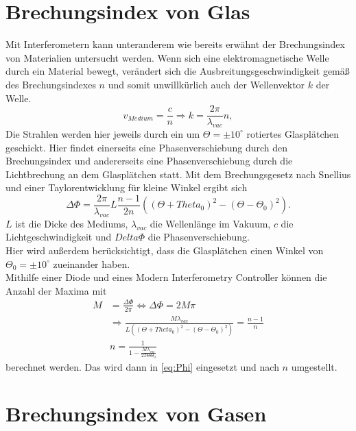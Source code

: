 \section{Brechungsindex von Glas}
\label{sec:BrechungGlas}
Mit Interferometern kann unteranderem wie bereits erwähnt der Brechungsindex von Materialien untersucht werden. Wenn sich eine elektromagnetische
Welle durch ein Material bewegt, verändert sich die Ausbreitungsgeschwindigkeit gemäß des Brechungsindexes $n$ und somit unwillkürlich auch der Wellenvektor $k$
der Welle.
\begin{equation}
    v_{Medium} = \frac{c}{n} \Rightarrow k = \frac{2\pi}{\lambda_{vac}}n,
\end{equation}
Die Strahlen werden hier jeweils durch ein um $\Theta = \pm 10^\circ$ rotiertes Glasplätchen geschickt. Hier findet einerseits eine Phasenverschiebung durch den Brechungsindex
und andererseits eine Phasenverschiebung durch die Lichtbrechung an dem Glasplätchen statt. Mit dem Brechungsgesetz nach Snellius und einer Taylorentwicklung für kleine
Winkel ergibt sich 
\begin{equation}
    \label{eq:Phi}
    \Delta \Phi = \frac{2\pi}{\lambda_{vac}}L\frac{n-1}{2n} \left((\Theta+Theta_0)^2 - (\Theta-\Theta_0)^2 \right).
\end{equation}
$L$ ist die Dicke des Mediums, $\lambda_{vac}$ die Wellenlänge im Vakuum, $c$ die Lichtgeschwindigkeit und $Delta \Phi$ die Phasenverschiebung.\\
Hier wird außerdem berücksichtigt, dass die Glasplätchen einen Winkel von $\Theta_0 = \pm 10^\circ$ zueinander haben.\\
Mithilfe einer Diode und eines Modern Interferometry Controller \cite{v64} können die Anzahl der Maxima mit
\begin{align}
\label{eq:Maxima}
    M   &= \frac{\Delta\Phi}{2\pi} \Leftrightarrow \Delta\Phi = 2M\pi  \\
        &\Rightarrow  \frac{M\lambda_{vac}}{L \left((\Theta+Theta_0)^2 - (\Theta-\Theta_0)^2 \right)} = \frac{n-1}{n} \\
        &n = \frac{1}{1- \frac{M \lambda_{vac}}{2 T \Theta \Theta_0}} 
\end{align}
berechnet werden. Das wird dann in \autoref{eq:Phi} eingesetzt und nach $n$ umgestellt.\\


\section{Brechungsindex von Gasen}
\label{sec:BrechungGas}

